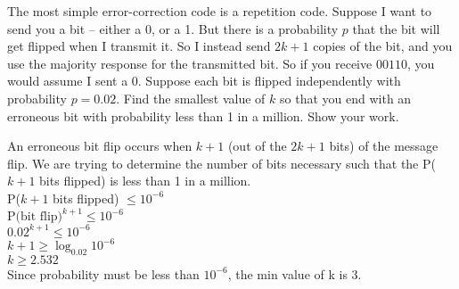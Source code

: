 \documentclass[solution,letterpaper]{cs20}
\begin{document}


    \begin{problem}
        The most simple error-correction code is a repetition code.
        Suppose I want to send you a bit -- either a 0, or a 1.
        But there is a probability $p$ that the bit will get flipped
        when I transmit it.  So I instead send $2k+1$ copies of the bit,
        and you use the majority response for the transmitted bit.
        So if you receive $00110$, you would assume I sent a 0.
        Suppose each bit is flipped independently with probability $p=0.02$.
        Find the smallest value of $k$ so that you end with an erroneous bit
        with probability less than 1 in a million. Show your work.

        \begin{solution}
            An erroneous bit flip occurs when $k+1$ (out of the $2k + 1$ bits) of the message flip. We are trying to determine the number of bits necessary such that the P($k+1$ bits flipped) is less than 1 in a million. \\
            P($k+1$ bits flipped) $\leq 10^{-6}$ \\
            $\text{P(bit flip)}^{k+1} \leq 10^{-6}$ \\
            $0.02^{k+1} \leq 10^{-6}$ \\
            $k+1 \geq \log_{0.02}{10^{-6}}$\\
            $k \geq 2.532$ \\
            Since probability must be less than $10^{-6}$, the min value of k is 3.
        \end{solution}
    \end{problem}
    \newpage
\end{document}
